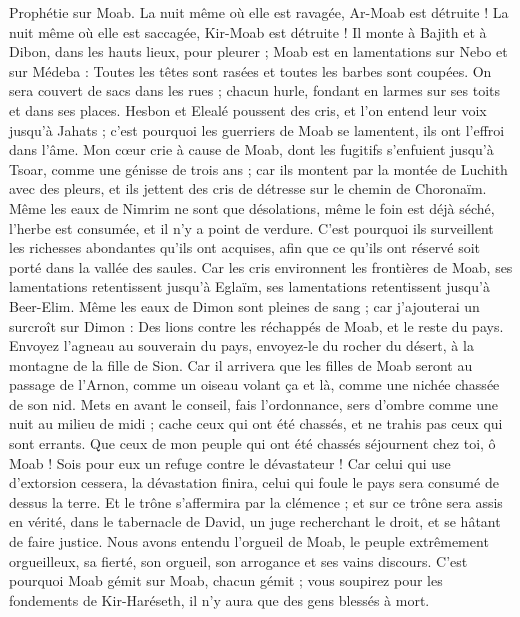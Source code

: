 \begin{multicols}{2}
\VerseOne{}Prophétie sur Moab. La nuit même où elle est ravagée, Ar-Moab est détruite ! La nuit même où elle est saccagée, Kir-Moab est détruite !
Il monte à Bajith et à Dibon, dans les hauts lieux, pour pleurer ; Moab est en lamentations sur Nebo et sur Médeba : Toutes les têtes sont rasées et toutes les barbes sont coupées.
On sera couvert de sacs dans les rues ; chacun hurle, fondant en larmes sur ses toits et dans ses places.
Hesbon et Elealé poussent des cris, et l'on entend leur voix jusqu'à Jahats ; c'est pourquoi les guerriers de Moab se lamentent, ils ont l'effroi dans l'âme.
Mon cœur crie à cause de Moab, dont les fugitifs s'enfuient jusqu'à Tsoar, comme une génisse de trois ans ; car ils montent par la montée de Luchith avec des pleurs, et ils jettent des cris de détresse sur le chemin de Choronaïm.
Même les eaux de Nimrim ne sont que désolations, même le foin est déjà séché, l'herbe est consumée, et il n'y a point de verdure.
C'est pourquoi ils surveillent les richesses abondantes qu'ils ont acquises, afin que ce qu'ils ont réservé soit porté dans la vallée des saules.
Car les cris environnent les frontières de Moab, ses lamentations retentissent jusqu'à Eglaïm, ses lamentations retentissent jusqu'à Beer-Elim.
Même les eaux de Dimon sont pleines de sang ; car j'ajouterai un surcroît sur Dimon : Des lions contre les réchappés de Moab, et le reste du pays.
\VerseOne{}Envoyez l'agneau au souverain du pays, envoyez-le du rocher du désert, à la montagne de la fille de Sion.
Car il arrivera que les filles de Moab seront au passage de l'Arnon, comme un oiseau volant ça et là, comme une nichée chassée de son nid.
Mets en avant le conseil, fais l'ordonnance, sers d'ombre comme une nuit au milieu de midi ; cache ceux qui ont été chassés, et ne trahis pas ceux qui sont errants.
Que ceux de mon peuple qui ont été chassés séjournent chez toi, ô Moab ! Sois pour eux un refuge contre le dévastateur ! Car celui qui use d'extorsion cessera, la dévastation finira, celui qui foule le pays sera consumé de dessus la terre.
Et le trône s'affermira par la clémence ; et sur ce trône sera assis en vérité, dans le tabernacle de David, un juge recherchant le droit, et se hâtant de faire justice.
Nous avons entendu l'orgueil de Moab, le peuple extrêmement orgueilleux, sa fierté, son orgueil, son arrogance et ses vains discours.
C'est pourquoi Moab gémit sur Moab, chacun gémit ; vous soupirez pour les fondements de Kir-Haréseth, il n'y aura que des gens blessés à mort.

\end{multicols}
